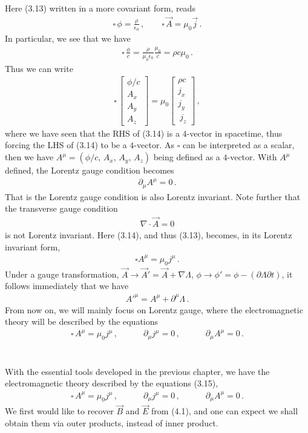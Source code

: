 \documentclass[11pt, onesided]{book}
\theoremstyle{break}
\theoremstyle{break}
\newcommand{\pd}{\partial}
\newcommand{\bmat}[1]{\begin{bmatrix} #1 \end{bmatrix}}
\begin{document}
Here (3.13) written in a more covariant form, reads
\begin{align*}
\square\, \phi = \frac{\rho}{\epsilon_0}\,,\qquad
\square\, \vec{A} = \mu_0 \vec{j}\,.
\end{align*}
In particular, we see that we have
\begin{align*}
\square \, \frac{\phi}{c} = \frac{\rho}{\mu_0 \epsilon_0}\frac{\mu_0}{c} = \rho c\mu_0\,.
\end{align*}
Thus we can write
\begin{align}
\square\, \bmat{\phi/c \\ A_x \\ A_y \\ A_z} = \mu_0 \bmat{\rho c \\ j_x \\ j_y \\\ j_z}\,, 
\end{align}
where we have seen that the RHS of (3.14) is a $4$-vector in spacetime, thus forcing the LHS of (3.14) to be a $4$-vector. As $\square$ can be interpreted as a scalar, then we have $A^\mu = (\phi/c,\, A_x,\, A_y,\,A_z)$ being defined as a $4$-vector. With $A^\mu$ defined, the Lorentz gauge condition becomes
\begin{align*}
\pd_\mu A^\mu = 0\,.
\end{align*}
That is the Lorentz gauge condition is also Lorentz invariant. Note further that the transverse gauge condition
\begin{align*}
\nabla \cdot \vec{A} = 0
\end{align*}
is not Lorentz invariant. Here (3.14), and thus (3.13), becomes, in its Lorentz invariant form,
\begin{align*}
\square A^\mu = \mu_0 j^\mu\,.
\end{align*}
Under a gauge transformation, $\vec{A} \to \vec{A}' = \vec{A} + \nabla \Lambda$, $\phi \to \phi' = \phi-(\pd\Lambda \pd t)$, it follows immediately that we have
\begin{align*}
A'^\mu = A^\mu + \pd^\mu \Lambda\,.
\end{align*}
From now on, we will mainly focus on Lorentz gauge, where the electromagnetic theory will be described by the equations
\begin{align}
\square \, A^\mu = \mu_0 j^\mu \,,\qquad\quad
\pd_\mu j^\mu = 0\,,\qquad\quad
\pd_\mu A^\mu = 0\,.
\end{align}

\chapter{}
With the essential tools developed in the previous chapter, we have the electromagnetic theory described by the equations (3.15), 
\begin{align}
\square \, A^\mu = \mu_0 j^\mu \,,\qquad\quad
\pd_\mu j^\mu = 0\,,\qquad\quad
\pd_\mu A^\mu = 0\,.
\end{align}
We first would like to recover $\vec{B}$ and $\vec{E}$ from (4.1), and one can expect we shall obtain them via outer products, instead of inner product.\\
\end{document}
